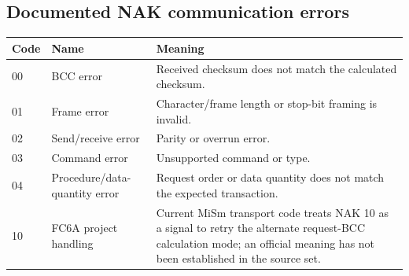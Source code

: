 \documentclass[10pt,letterpaper]{article}
\begin{document}
\subsection{Documented NAK communication errors}
\begin{longtable}{@{}p{1.3cm}p{5.0cm}p{9.5cm}@{}}
\toprule
Code & Name & Meaning \\
\midrule
00 & BCC error & Received checksum does not match the calculated checksum. \\
01 & Frame error & Character/frame length or stop-bit framing is invalid. \\
02 & Send/receive error & Parity or overrun error. \\
03 & Command error & Unsupported command or type. \\
04 & Procedure/data-quantity error & Request order or data quantity does not match the expected transaction. \\
10 & FC6A project handling & Current MiSm transport code treats NAK 10 as a signal to retry the alternate request-BCC calculation mode; an official meaning has not been established in the source set. \\
\bottomrule
\end{longtable}
\end{document}
